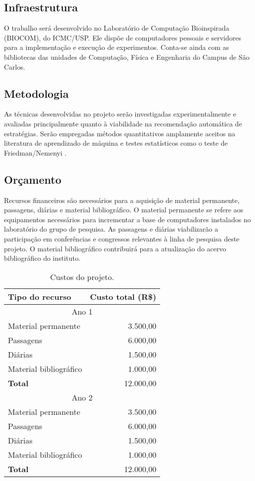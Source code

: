 \subsection{Infraestrutura}
O trabalho será desenvolvido no Laboratório de Computação Bioinspirada (BIOCOM),
do ICMC/USP.
Ele dispõe de computadores pessoais e servidores para a implementação
e execução de experimentos.
Conta-se ainda com as bibliotecas
das unidades de Computação, Física e Engenharia do Campus de São Carlos.

\subsection{Metodologia}
As técnicas desenvolvidas no projeto serão investigadas
experimentalmente e avaliadas principalmente quanto à viabilidade na recomendação
automática de estratégias.
Serão empregadas métodos quantitativos amplamente aceitos na literatura de aprendizado de máquina \citep{Bishop2006} e testes estatísticos
como o teste de Friedman/Nemenyi \citep{journals/jmlr/Demsar06}.

\subsection{Orçamento}
Recursos financeiros são necessários para a aquisição de material permanente,
passagens, diárias e material bibliográfico.
O material permanente se refere aos equipamentos necessários para incrementar a
base de computadores instalados no laboratório do grupo de pesquisa.
As passagens e diárias viabilizarão a participação em conferências e congressos relevantes à linha de pesquisa deste projeto.
O material bibliográfico contribuirá para a atualização do acervo bibliográfico do
instituto.

\begin{table}[!htp]
\centering
\begin{tabular}{|lr|}
\hline
\textbf{Tipo do recurso} & \textbf{Custo total (R\$)} \\
\hline
\multicolumn{2}{|c|}{Ano 1} \\
\hline
Material permanente & 3.500,00 \\
Passagens           & 6.000,00 \\
Diárias             & 1.500,00 \\
Material bibliográfico & 1.000,00 \\
\textbf{Total} & 12.000,00 \\
\hline
\multicolumn{2}{|c|}{Ano 2} \\
\hline
Material permanente & 3.500,00 \\
Passagens           & 6.000,00 \\
Diárias             & 1.500,00 \\
Material bibliográfico & 1.000,00 \\
\textbf{Total} & 12.000,00 \\
\hline
\end{tabular}
\caption{Custos do projeto.}
\end{table}


